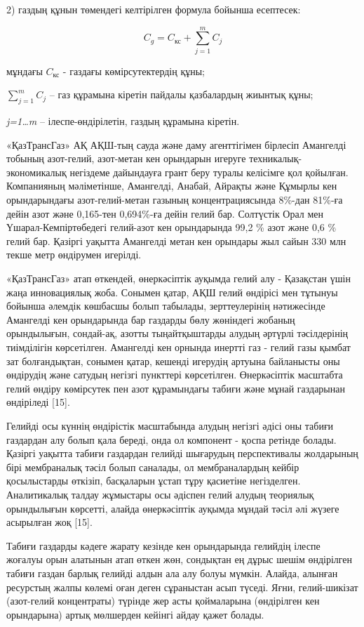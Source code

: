 \begin{multicols}{2}
  2) газдың құнын төмендегі келтірілген формула бойынша есептесек:

\begin{equation}
  C_g = C_{\text{кс}} + \sum_{j=1}^{m} C_j
  \end{equation}
  

мұндағы $C_{\text{кс}}$ - газдағы көмірсутектердің құны;

$\sum_{j=1}^{m} C_j$ -- газ құрамына кіретін пайдалы қазбалардың
жиынтық құны;

\emph{j=1\ldots m} -- ілеспе-өндірілетін, газдың құрамына кіретін.

«ҚазТрансГаз» АҚ АҚШ-тың сауда және даму агенттігімен бірлесіп Амангелді
тобының азот-гелий, азот-метан кен орындарын игеруге
техникалық-экономикалық негіздеме дайындауға грант беру туралы келісімге
қол қойылған. Компанияның мәліметінше, Амангелді, Анабай, Айрақты және
Құмырлы кен орындарындағы азот-гелий-метан газының концентрациясында
8\%-дан 81\%-ға дейін азот және 0,165-тен 0,694\%-ға дейін гелий бар.
Солтүстік Орал мен Үшарал-Кемпіртөбедегі гелий-азот кен орындарында 99,2
\% азот және 0,6 \% гелий бар. Қазіргі уақытта Амангелді метан кен
орындары жыл сайын 330 млн текше метр өндірумен игерілді.

«ҚазТрансГаз» атап өткендей, өнеркәсіптік ауқымда гелий алу - Қазақстан
үшін жаңа инновациялық жоба. Сонымен қатар, АҚШ гелий өндірісі мен
тұтынуы бойынша әлемдік көшбасшы болып табылады, зерттеулерінің
нәтижесінде Амангелді кен орындарында бар газдарды бөлу жөніндегі
жобаның орындылығын, сондай-ақ, азотты тыңайтқыштарды алудың әртүрлі
тәсілдерінің тиімділігін көрсетілген. Амангелді кен орнында инертті газ
- гелий газы қымбат зат болғандықтан, сонымен қатар, кешенді игерудің
артуына байланысты оны өндірудің және сатудың негізгі пункттері
көрсетілген. Өнеркәсіптік масштабта гелий өндіру көмірсутек пен азот
құрамындағы табиғи және мұнай газдарынан өндіріледі {[}15{]}.

Гелийді осы күннің өндірістік масштабында алудың негізгі әдісі оны
табиғи газдардан алу болып қала береді, онда ол компонент - қоспа
ретінде болады. Қазіргі уақытта табиғи газдардан гелийді шығарудың
перспективалы жолдарының бірі мембраналық тәсіл болып саналады, ол
мембраналардың кейбір қосылыстарды өткізіп, басқаларын ұстап тұру
қасиетіне негізделген. Аналитикалық талдау жұмыстары осы әдіспен гелий
алудың теориялық орындылығын көрсетті, алайда өнеркәсіптік ауқымда
мұндай тәсіл әлі жүзеге асырылған жоқ {[}15{]}.

Табиғи газдарды кәдеге жарату кезінде кен орындарында гелийдің ілеспе
жоғалуы орын алатынын атап өткен жөн, сондықтан ең дұрыс шешім
өндірілген табиғи газдан барлық гелийді алдын ала алу болуы мүмкін.
Алайда, алынған ресурстың жалпы көлемі оған деген сұраныстан асып
түседі. Яғни, гелий-шикізат (азот-гелий концентраты) түрінде жер асты
қоймаларына (өндірілген кен орындарына) артық мөлшерден кейінгі айдау
қажет болады.


\end{multicols}
